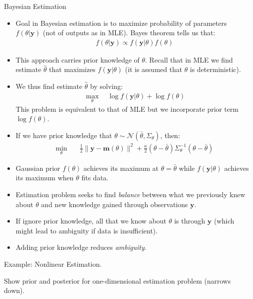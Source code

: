 \documentclass[9pt]{beamer}
\begin{document}
%
\begin{frame}{Bayesian Estimation}

\begin{itemize}
\item Goal in Bayesian estimation is to maximize probability of parameters $f(\theta|\mathbf{y})$ (not of outputs as in MLE). Bayes theorem tells us that:
\begin{align*}
f(\theta|\mathbf{y})\propto f(\mathbf{y}|\theta)f(\theta)
\end{align*}
\item This approach carries prior knowledge of $\theta$.  Recall that in MLE we find estimate $\hat{\theta}$ that maximizes $f(\mathbf{y}|\theta)$ (it is assumed that $\theta$ is deterministic). 

\item We thus find estimate $\hat{\theta}$ by solving:
\begin{align*}
\max_\theta\quad  \log f(\mathbf{y}|\theta)+\log f(\theta)
\end{align*}
This problem is equivalent to that of MLE but we incorporate prior term $\log f(\theta)$. 
\item If we have prior knowledge that $\theta\sim \mathcal{N}(\bar{\theta},\Sigma_\theta)$, then: 
\begin{align*}
\min_{\theta}& \quad \frac{1}{2}\|\mathbf{y}- \mathbf{m}(\theta)\|^2+\frac{\kappa}{2}(\theta-\bar{\theta})\Sigma_\theta^{-1}(\theta-\bar{\theta})  
\end{align*}
\item Gaussian prior $f(\theta)$ achieves its maximum at $\theta=\bar{\theta}$ while $f(\mathbf{y}|\theta)$ achieves its maximum when $\theta$ fits data. 
\item Estimation problem seeks to find {\em balance} between what we previously knew about $\theta$ and new knowledge gained through observations $\mathbf{y}$. 
\item If ignore prior knowledge, all that we know about $\theta$ is through $\mathbf{y}$ (which might lead to ambiguity if data is insufficient). 
\item Adding prior knowledge reduces {\em ambiguity}. 
\end{itemize}

\end{frame}

%
\begin{frame}{Example: Nonlinear Estimation.}

\begin{block}{}
Show prior and posterior for one-dimensional estimation problem (narrows down). 
\end{block}

\end{frame}
\end{document}
